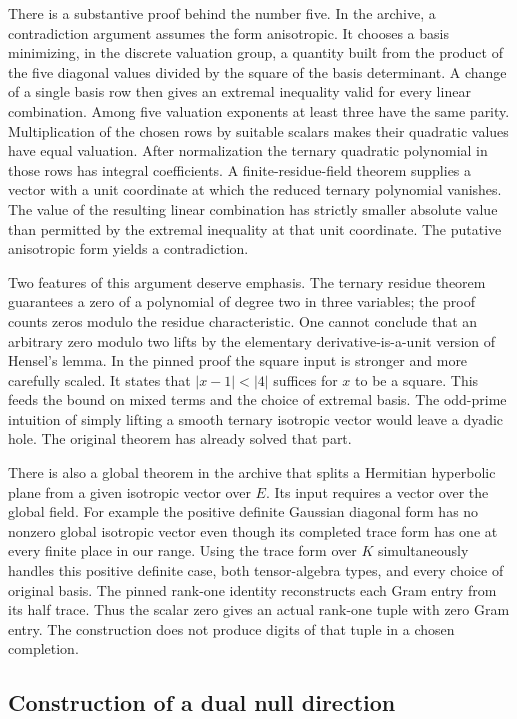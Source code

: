 \documentclass[12pt,letterpaper]{article}
\begin{document}
There is a substantive proof behind the number five. In the archive, a contradiction argument assumes the form anisotropic. It chooses a basis minimizing, in the discrete valuation group, a quantity built from the product of the five diagonal values divided by the square of the basis determinant. A change of a single basis row then gives an extremal inequality valid for every linear combination. Among five valuation exponents at least three have the same parity. Multiplication of the chosen rows by suitable scalars makes their quadratic values have equal valuation. After normalization the ternary quadratic polynomial in those rows has integral coefficients. A finite-residue-field theorem supplies a vector with a unit coordinate at which the reduced ternary polynomial vanishes. The value of the resulting linear combination has strictly smaller absolute value than permitted by the extremal inequality at that unit coordinate. The putative anisotropic form yields a contradiction.

Two features of this argument deserve emphasis. The ternary residue theorem guarantees a zero of a polynomial of degree two in three variables; the proof counts zeros modulo the residue characteristic. One cannot conclude that an arbitrary zero modulo two lifts by the elementary derivative-is-a-unit version of Hensel's lemma. In the pinned proof the square input is stronger and more carefully scaled. It states that $|x-1|<|4|$ suffices for $x$ to be a square. This feeds the bound on mixed terms and the choice of extremal basis. The odd-prime intuition of simply lifting a smooth ternary isotropic vector would leave a dyadic hole. The original theorem has already solved that part.

There is also a global theorem in the archive that splits a Hermitian hyperbolic plane from a given isotropic vector over $E$. Its input requires a vector over the global field. For example the positive definite Gaussian diagonal form has no nonzero global isotropic vector even though its completed trace form has one at every finite place in our range. Using the trace form over $K$ simultaneously handles this positive definite case, both tensor-algebra types, and every choice of original basis. The pinned rank-one identity reconstructs each Gram entry from its half trace. Thus the scalar zero gives an actual rank-one tuple with zero Gram entry. The construction does not produce digits of that tuple in a chosen completion.

\subsection{Construction of a dual null direction}
\end{document}
